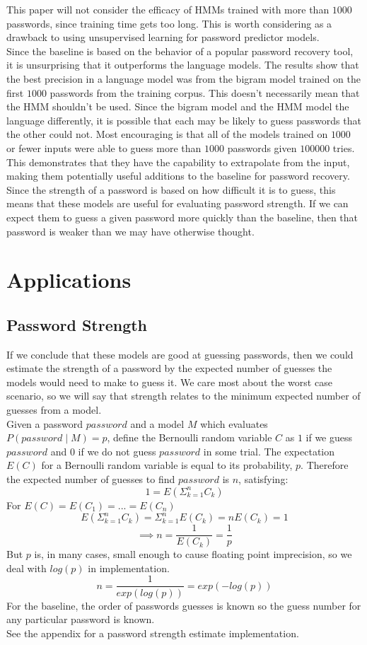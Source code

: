 \documentclass{amsart}
\theoremstyle{definition}
\theoremstyle{remark}
\numberwithin{equation}{section}
\begin{document}
This paper will not consider the efficacy of HMMs trained with more than $1000$ passwords, since training time gets too long. This is worth considering as a drawback to using unsupervised learning for password predictor models.\\
Since the baseline is based on the behavior of a popular password recovery tool, it is unsurprising that it outperforms the language models. The results show that the best precision in a language model was from the bigram model trained on the first $1000$ passwords from the training corpus. This doesn't necessarily mean that the HMM shouldn't be used. Since the bigram model and the HMM model the language differently, it is possible that each may be likely to guess passwords that the other could not. Most encouraging is that all of the models trained on $1000$ or fewer inputs were able to guess more than $1000$ passwords given $100000$ tries. This demonstrates that they have the capability to extrapolate from the input, making them potentially useful additions to the baseline for password recovery. Since the strength of a password is based on how difficult it is to guess, this means that these models are useful for evaluating password strength. If we can expect them to guess a given password more quickly than the baseline, then that password is weaker than we may have otherwise thought.

\section{Applications}
\subsection{Password Strength}
If we conclude that these models are good at guessing passwords, then we could estimate the strength of a password by the expected number of guesses the models would need to make to guess it. We care most about the worst case scenario, so we will say that strength relates to the minimum expected number of guesses from a model.\\
Given a password $password$ and a model $M$ which evaluates $P(password \mid M) = p$, define the Bernoulli random variable $C$ as $1$ if we guess $password$ and $0$ if we do not guess $password$ in some trial. The expectation $E(C)$ for a Bernoulli random variable is equal to its probability, $p$. Therefore the expected number of guesses to find $password$ is $n$, satisfying:\\
$$1 = E(\Sigma_{k = 1}^n C_k)$$
For $E(C) = E(C_1) = ... = E(C_n)$
$$E(\Sigma_{k = 1}^n C_k) = \Sigma_{k = 1}^n E(C_k) = nE(C_k) = 1$$
$$\implies n = \frac{1}{E(C_k)} = \frac{1}{p}$$
But $p$ is, in many cases, small enough to cause floating point imprecision, so we deal with $log(p)$ in implementation.
$$n = \frac{1}{exp(log(p))} = exp(-log(p))$$
For the baseline, the order of passwords guesses is known so the guess number for any particular password is known.\\
See the appendix for a password strength estimate implementation.\\
\end{document}
